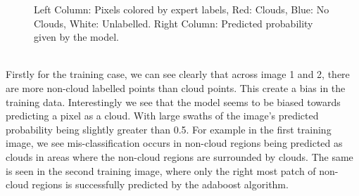 \documentclass[11pt, letterpaper, journal]{IEEEtran}
\begin{document}
\begin{figure}%
    \centering
    \qquad
    \qquad
    \caption{Left Column: Pixels colored by expert labels, Red: Clouds, Blue: No Clouds, White: Unlabelled. Right Column: Predicted probability given by the model.}%
    \label{fig:Probability_Preds}%
\end{figure}
\\
Firstly for the training case, we can see clearly that across image 1 and 2, there are more non-cloud labelled points than cloud points. This create a bias in the training data. Interestingly we see that the model seems to be biased towards predicting a pixel as a cloud. With large swaths of the image's predicted probability being slightly greater than 0.5. For example in the first training image, we see mis-classification occurs in non-cloud regions being predicted as clouds in areas where the non-cloud regions are surrounded by clouds. The same is seen in the second training image, where only the right most patch of non-cloud regions is successfully predicted by the adaboost algorithm. 
\\
\end{document}
